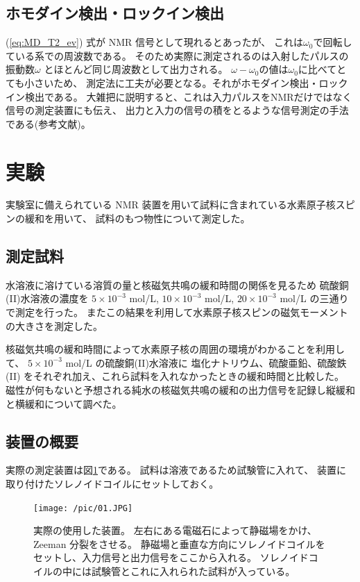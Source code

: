 \documentclass[11pt,dvipdfmx,a4paper]{jsarticle}
\begin{document}
\subsection{ホモダイン検出・ロックイン検出}
(\ref{eq:MD_T2_ev}) 式が NMR 信号として現れるとあったが、
これは\(\omega_0\)で回転している系での周波数である。
そのため実際に測定されるのは入射したパルスの振動数\(\omega\)
とほとんど同じ周波数として出力される。
\(\omega-\omega_0\)の値は\(\omega_0\)に比べてとても小さいため、
測定法に工夫が必要となる。それがホモダイン検出・ロックイン検出である。
大雑把に説明すると、これは入力パルスをNMRだけではなく信号の測定装置にも伝え、
出力と入力の信号の積をとるような信号測定の手法である(参考文献\cite{Morita_2010})。


\section{実験}
実験室に備えられている NMR 装置を用いて試料に含まれている水素原子核スピンの緩和を用いて、
試料のもつ物性について測定した。
\subsection{測定試料}
水溶液に溶けている溶質の量と核磁気共鳴の緩和時間の関係を見るため
硫酸銅(II)水溶液の濃度を
\(5\times 10^{-3}\) mol/L,
\(10\times 10^{-3}\) mol/L,
\(20\times 10^{-3}\) mol/L
の三通りで測定を行った。
またこの結果を利用して水素原子核スピンの磁気モーメントの大きさを測定した。

核磁気共鳴の緩和時間によって水素原子核の周囲の環境がわかることを利用して、
\(5\times 10^{-3}\) mol/L の硫酸銅(II)水溶液に
塩化ナトリウム、硫酸亜鉛、硫酸鉄(II)
をそれぞれ加え、これら試料を入れなかったときの緩和時間と比較した。
磁性が何もないと予想される純水の核磁気共鳴の緩和の出力信号を記録し縦緩和と横緩和について調べた。

\subsection{装置の概要}
実際の測定装置は図\ref{pic:machine}である。
試料は溶液であるため試験管に入れて、
装置に取り付けたソレノイドコイルにセットしておく。
\begin{figure}[H]
	\centering
	\texttt{[image: /pic/01.JPG]}
	\caption{実際の使用した装置。
	左右にある電磁石によって静磁場をかけ、Zeeman 分裂をさせる。
	静磁場と垂直な方向にソレノイドコイルをセットし、入力信号と出力信号をここから入れる。
	ソレノイドコイルの中には試験管とこれに入れられた試料が入っている。}
	\label{pic:machine}
\end{figure}
\end{document}

